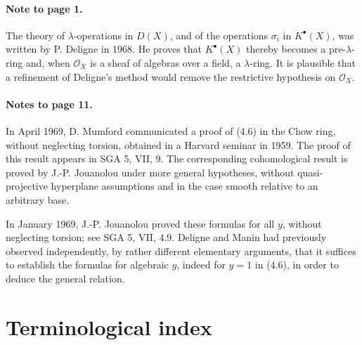 \documentclass[12pt]{article}
\newcommand{\cO}{\mathcal O}
\begin{document}
\paragraph{Note to page 1.}
The theory of $\lambda$-operations in $D(X)$, and of the operations $\sigma_i$ in $K^\bullet(X)$, was written by P. Deligne in 1968. He proves that $K^\bullet(X)$ thereby becomes a pre-$\lambda$-ring and, when $\cO_X$ is a sheaf of algebras over a field, a $\lambda$-ring. It is plausible that a refinement of Deligne's method would remove the restrictive hypothesis on $\cO_X$.

\paragraph{Notes to page 11.}
In April 1969, D. Mumford communicated a proof of (4.6) in the Chow ring, without neglecting torsion, obtained in a Harvard seminar in 1959. The proof of this result appears in SGA 5, VII, 9. The corresponding cohomological result is proved by J.-P. Jouanolou under more general hypotheses, without quasi-projective hyperplane assumptions and in the case smooth relative to an arbitrary base.

In January 1969, J.-P. Jouanolou proved these formulas for all $y$, without neglecting torsion; see SGA 5, VII, 4.9. Deligne and Manin had previously observed independently, by rather different elementary arguments, that it suffices to establish the formulas for algebraic $y$, indeed for $y=1$ in (4.6), in order to deduce the general relation.

\newpage
\section*{Terminological index}
\end{document}
